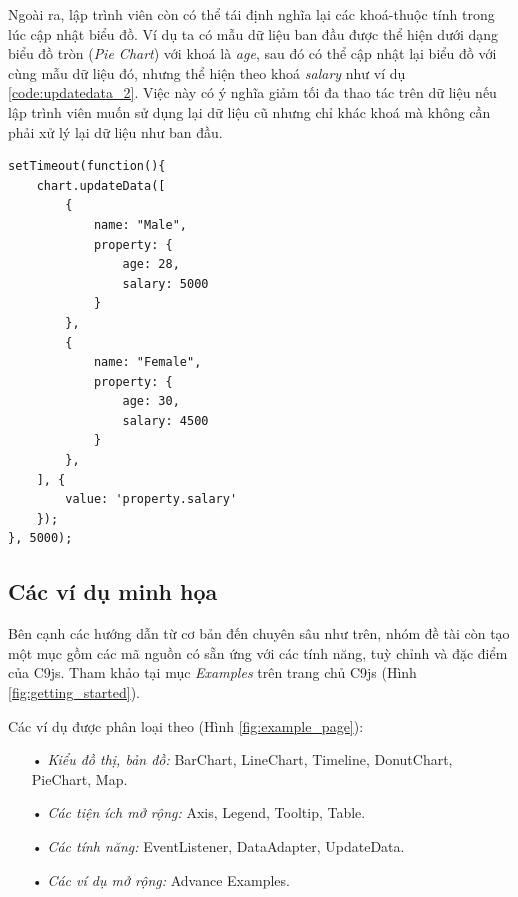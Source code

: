 \documentclass[12pt,a4paper,twoside]{article}
\begin{document}
Ngoài ra, lập trình viên còn có thể tái định nghĩa lại các khoá-thuộc tính trong lúc cập nhật biểu đồ. Ví dụ ta có mẫu dữ liệu ban đầu được thể hiện dưới dạng biểu đồ tròn (\textit{Pie Chart}) với khoá là \textit{age}, sau đó có thể cập nhật lại biểu đồ với cùng mẫu dữ liệu đó, nhưng thể hiện theo khoá \textit{salary} như ví dụ \ref{code:updatedata_2}. Việc này có ý nghĩa giảm tối đa thao tác trên dữ liệu nếu lập trình viên muốn sử dụng lại dữ liệu cũ nhưng chỉ khác khoá mà không cần phải xử lý lại dữ liệu như ban đầu.

\begin{lstlisting}[caption=Định nghĩa lại khoá-thuộc tính trong lúc cập nhật, label={code:updatedata_2}]
setTimeout(function(){
    chart.updateData([
        {
            name: "Male", 
            property: {
                age: 28,
                salary: 5000
            }
        },
        {
            name: "Female", 
            property: {
                age: 30,
                salary: 4500
            }
        },
    ], {
        value: 'property.salary'
    });
}, 5000);
\end{lstlisting}

\subsection{Các ví dụ minh họa}
Bên cạnh các hướng dẫn từ cơ bản đến chuyên sâu như trên, nhóm đề tài còn tạo một mục gồm các mã nguồn có sẵn ứng với các tính năng, tuỳ chỉnh và đặc điểm của C9js. Tham khảo tại mục \textit{Examples} trên trang chủ C9js (Hình \ref{fig:getting_started}). 

Các ví dụ được phân loại theo (Hình \ref{fig:example_page}):
\begin{itemize}
\item[•] \emph{Kiểu đồ thị, bản đồ:} BarChart, LineChart, Timeline, DonutChart, PieChart, Map.
\item[•] \emph{Các tiện ích mở rộng:} Axis, Legend, Tooltip, Table.
\item[•] \emph{Các tính năng:} EventListener, DataAdapter, UpdateData.
\item[•] \emph{Các ví dụ mở rộng:} Advance Examples.
\end{itemize}
\end{document}
